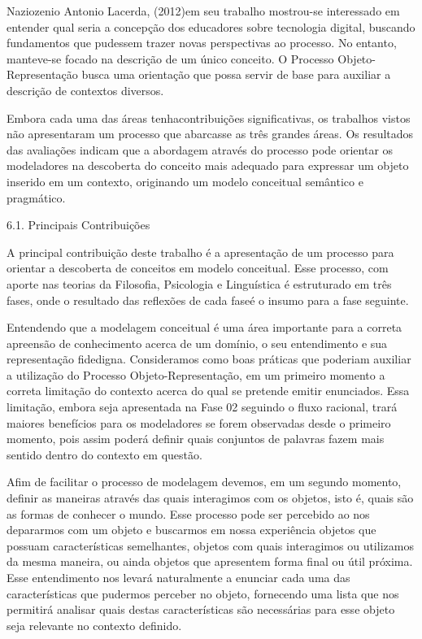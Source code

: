 Naziozenio Antonio Lacerda, (2012)em seu trabalho mostrou-se interessado em entender qual seria a concepção dos educadores sobre tecnologia digital, buscando fundamentos que pudessem trazer novas perspectivas ao processo. No entanto, manteve-se focado na descrição de um único conceito. O Processo Objeto-Representação busca uma orientação que possa servir de base para auxiliar a descrição de contextos diversos.

Embora cada uma das áreas tenhacontribuições significativas, os trabalhos vistos não apresentaram um processo que abarcasse as três grandes áreas. Os resultados das avaliações indicam que a abordagem através do processo pode orientar os modeladores na descoberta do conceito mais adequado para expressar um objeto inserido em um contexto, originando um modelo conceitual semântico e pragmático.

6.1. Principais Contribuições

A principal contribuição deste trabalho é a apresentação de um processo para orientar a descoberta de conceitos em modelo conceitual. Esse processo, com aporte nas teorias da Filosofia, Psicologia e Linguística é estruturado em três fases, onde o resultado das reflexões de cada faseé o insumo para a fase seguinte.

Entendendo que a modelagem conceitual é uma área importante para a correta apreensão de conhecimento acerca de um domínio, o seu entendimento e sua representação fidedigna. Consideramos como boas práticas que poderiam auxiliar a utilização do Processo Objeto-Representação, em um primeiro momento a correta limitação do contexto acerca do qual se pretende emitir enunciados. Essa limitação, embora seja apresentada na Fase 02 seguindo o fluxo racional, trará maiores benefícios para os modeladores se forem observadas desde o primeiro momento, pois assim poderá definir quais conjuntos de palavras fazem mais sentido dentro do contexto em questão.

Afim de facilitar o processo de modelagem devemos, em um segundo momento, definir as maneiras através das quais interagimos com os objetos, isto é, quais são as formas de conhecer o mundo. Esse processo pode ser percebido ao nos depararmos com um objeto e buscarmos em nossa experiência objetos que possuam características semelhantes, objetos com quais interagimos ou utilizamos da mesma maneira, ou ainda objetos que apresentem forma final ou útil próxima. Esse entendimento nos levará naturalmente a enunciar cada uma das características que pudermos perceber no objeto, fornecendo uma lista que nos permitirá analisar quais destas características são necessárias para esse objeto seja relevante no contexto definido.


